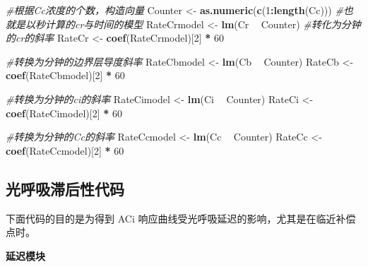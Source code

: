 \documentclass[
]{krantz}
\makeatletter
\newenvironment{Shaded}{\begin{snugshade}}{\end{snugshade}}
\newcommand{\CommentTok}[1]{\textcolor[rgb]{0.56,0.35,0.01}{\textit{#1}}}
\newcommand{\DecValTok}[1]{\textcolor[rgb]{0.00,0.00,0.81}{#1}}
\newcommand{\KeywordTok}[1]{\textcolor[rgb]{0.13,0.29,0.53}{\textbf{#1}}}
\newcommand{\NormalTok}[1]{#1}
\newcommand{\OperatorTok}[1]{\textcolor[rgb]{0.81,0.36,0.00}{\textbf{#1}}}
\newcommand{\StringTok}[1]{\textcolor[rgb]{0.31,0.60,0.02}{#1}}
\newenvironment{kframe}{%
\medskip{}
\setlength{\fboxsep}{.8em}
 \def\at@end@of@kframe{}%
 \ifinner\ifhmode%
  \def\at@end@of@kframe{\end{minipage}}%
  \begin{minipage}{\columnwidth}%
 \fi\fi%
 \def\FrameCommand##1{\hskip\@totalleftmargin \hskip-\fboxsep
 \colorbox{shadecolor}{##1}\hskip-\fboxsep
     \hskip-\linewidth \hskip-\@totalleftmargin \hskip\columnwidth}%
 \MakeFramed {\advance\hsize-\width
   \@totalleftmargin\z@ \linewidth\hsize
   \@setminipage}}%
 {\par\unskip\endMakeFramed%
 \at@end@of@kframe}
\renewenvironment{Shaded}{\begin{kframe}}{\end{kframe}}
\makeatother
\begin{document}
\begin{Shaded}
\begin{Highlighting}[]
\CommentTok{#根据Cc浓度的个数，构造向量}
\NormalTok{Counter <-}\StringTok{ }\KeywordTok{as.numeric}\NormalTok{(}\KeywordTok{c}\NormalTok{(}\DecValTok{1}\OperatorTok{:}\KeywordTok{length}\NormalTok{(Cc)))}
\CommentTok{#也就是以秒计算的cr与时间的模型}
\NormalTok{RateCrmodel <-}\StringTok{ }\KeywordTok{lm}\NormalTok{(Cr }\OperatorTok{~}\StringTok{ }\NormalTok{Counter)}
\CommentTok{#转化为分钟的cr的斜率}
\NormalTok{RateCr <-}\StringTok{ }\KeywordTok{coef}\NormalTok{(RateCrmodel)[}\DecValTok{2}\NormalTok{] }\OperatorTok{*}\StringTok{ }\DecValTok{60}

\CommentTok{#转换为分钟的边界层导度斜率}
\NormalTok{RateCbmodel <-}\StringTok{ }\KeywordTok{lm}\NormalTok{(Cb }\OperatorTok{~}\StringTok{ }\NormalTok{Counter)}
\NormalTok{RateCb <-}\StringTok{ }\KeywordTok{coef}\NormalTok{(RateCbmodel)[}\DecValTok{2}\NormalTok{] }\OperatorTok{*}\StringTok{ }\DecValTok{60}

\CommentTok{#转换为分钟的ci的斜率}
\NormalTok{RateCimodel <-}\StringTok{ }\KeywordTok{lm}\NormalTok{(Ci }\OperatorTok{~}\StringTok{ }\NormalTok{Counter)}
\NormalTok{RateCi <-}\StringTok{ }\KeywordTok{coef}\NormalTok{(RateCimodel)[}\DecValTok{2}\NormalTok{] }\OperatorTok{*}\StringTok{ }\DecValTok{60}

\CommentTok{#转换为分钟的Cc的斜率}
\NormalTok{RateCcmodel <-}\StringTok{ }\KeywordTok{lm}\NormalTok{(Cc }\OperatorTok{~}\StringTok{ }\NormalTok{Counter)}
\NormalTok{RateCc <-}\StringTok{ }\KeywordTok{coef}\NormalTok{(RateCcmodel)[}\DecValTok{2}\NormalTok{] }\OperatorTok{*}\StringTok{ }\DecValTok{60} 
\end{Highlighting}
\end{Shaded}

\hypertarget{code-photoresp}{%
\subsection{光呼吸滞后性代码}\label{code-photoresp}}

下面代码的目的是为得到 ACi 响应曲线受光呼吸延迟的影响，尤其是在临近补偿点时。

\textbf{延迟模块}
\end{document}
